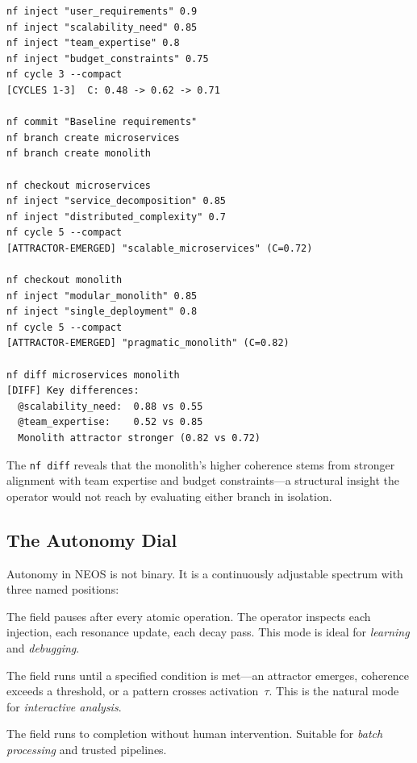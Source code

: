 \begin{terminalbox}
\begin{lstlisting}[style=neosshell]
nf inject "user_requirements" 0.9
nf inject "scalability_need" 0.85
nf inject "team_expertise" 0.8
nf inject "budget_constraints" 0.75
nf cycle 3 --compact
[CYCLES 1-3]  C: 0.48 -> 0.62 -> 0.71

nf commit "Baseline requirements"
nf branch create microservices
nf branch create monolith

nf checkout microservices
nf inject "service_decomposition" 0.85
nf inject "distributed_complexity" 0.7
nf cycle 5 --compact
[ATTRACTOR-EMERGED] "scalable_microservices" (C=0.72)

nf checkout monolith
nf inject "modular_monolith" 0.85
nf inject "single_deployment" 0.8
nf cycle 5 --compact
[ATTRACTOR-EMERGED] "pragmatic_monolith" (C=0.82)

nf diff microservices monolith
[DIFF] Key differences:
  @scalability_need:  0.88 vs 0.55
  @team_expertise:    0.52 vs 0.85
  Monolith attractor stronger (0.82 vs 0.72)
\end{lstlisting}
\end{terminalbox}

\noindent
The \texttt{nf diff} reveals that the monolith's higher coherence stems
from stronger alignment with team expertise and budget constraints---a
structural insight the operator would not reach by evaluating either
branch in isolation.

\subsection{The Autonomy Dial}\label{sec:autonomy}

Autonomy in NEOS is not binary.  It is a continuously adjustable
spectrum with three named positions:

\begin{description}[leftmargin=*]
\item[Step.]  The field pauses after every atomic operation.  The
  operator inspects each injection, each resonance update, each decay
  pass.  This mode is ideal for \emph{learning} and \emph{debugging}.
\item[Checkpoint.]  The field runs until a specified condition is
  met---an attractor emerges, coherence exceeds a threshold, or a
  pattern crosses activation~$\tau$.  This is the natural mode for
  \emph{interactive analysis}.
\item[Auto.]  The field runs to completion without human
  intervention.  Suitable for \emph{batch processing} and trusted
  pipelines.
\end{description}

